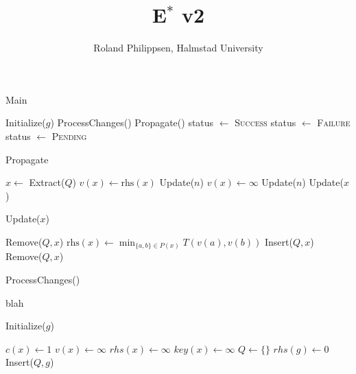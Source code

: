 \documentclass[twocolumn]{article}
\newcommand{\rhs}{\text{rhs}}
\begin{document}
\title{E$^\ast$ v2}
\author{Roland Philippsen, Halmstad University}
\maketitle

\begin{algorithm}
  \caption{Main}
  \begin{algorithmic}
    \STATE Initialize($g$)
    \LOOP
      \STATE ProcessChanges()
      \STATE Propagate()
        \STATE status $\leftarrow$ \textsc{Success}
        \STATE status $\leftarrow$ \textsc{Failure}
      \ELSE
        \STATE status $\leftarrow$ \textsc{Pending}
      \ENDIF
    \ENDLOOP
  \end{algorithmic}
\end{algorithm}

\begin{algorithm}
  \caption{Propagate}
  \begin{algorithmic}
      \STATE $x \leftarrow$ Extract($Q$)
      \IF { $v(x) > \rhs(x)$ }
        \STATE $v(x) \leftarrow \rhs(x)$
          \STATE Update($n$)
        \ENDFOR
      \ELSE
        \STATE $v(x) \leftarrow \infty$
          \STATE Update($n$)
        \ENDFOR
        \STATE Update($x$)
      \ENDIF
    \ENDIF
  \end{algorithmic}
\end{algorithm}

\begin{algorithm}
  \caption{Update($x$)}
  \begin{algorithmic}
      \STATE Remove($Q, x$)
    \ELSE
      \STATE $\rhs(x) \leftarrow \min_{\{a,b\} \in P(x)} T(v(a),v(b))$
      \IF { $v(x) \ne \rhs(x)$ }
        \STATE Insert($Q, x$)
      \ELSE
        \STATE Remove($Q, x$)
      \ENDIF
    \ENDIF
  \end{algorithmic}
\end{algorithm}

\begin{algorithm}
  \caption{ProcessChanges()}
  \begin{algorithmic}
    \STATE blah
  \end{algorithmic}
\end{algorithm}

\begin{algorithm}
  \caption{Initialize($g$)}
  \begin{algorithmic}
      \STATE $c(x) \leftarrow 1$
      \STATE $v(x) \leftarrow \infty$
      \STATE $rhs(x) \leftarrow \infty$
      \STATE $key(x) \leftarrow \infty$
    \ENDFOR
    \STATE $Q \leftarrow \{\}$
    \STATE $rhs(g) \leftarrow 0$
    \STATE Insert($Q,g$)
  \end{algorithmic}
\end{algorithm}
\end{document}
